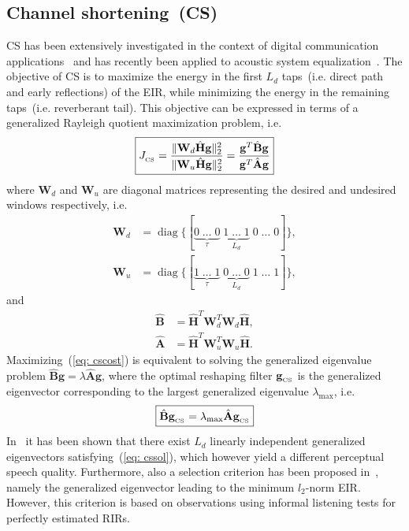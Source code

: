\documentclass{article}
\DeclareMathOperator{\diag}{diag}
\begin{document}
\subsection{Channel shortening~(CS)}
CS has been extensively investigated in the context of digital communication applications~\cite{Martin_ITSP_2005} and has recently been applied to acoustic system equalization~\cite{Zhang_IWAENC_2010,Kallinger_ICASSP_2006}.
The objective of CS is to maximize the energy in the first $L_d$ taps~(i.e. direct path and early reflections) of the EIR, while minimizing the energy in the remaining taps~(i.e. reverberant tail).
This objective can be expressed in terms of a generalized Rayleigh quotient maximization problem, i.e.
\begin{equation}
  \label{eq: cscost}
  \boxed{J_{_{\rm CS}} = \frac{\|\mathbf{W}_d \hat{\mathbf{H}}\mathbf{g} \|_2^2}{\|\mathbf{W}_u \hat{\mathbf{H}}\mathbf{g} \|_2^2} = \frac{\mathbf{g}^T\hat{\mathbf{B}}\mathbf{g}}{\mathbf{g}^T\hat{\mathbf{A}}\mathbf{g}}}
\end{equation}
where $\mathbf{W}_d$ and $\mathbf{W}_u$ are diagonal matrices representing the desired and undesired windows respectively, i.e.
\begin{align}
\label{eq: wincs}
\mathbf{W}_d & = {\diag} \{ [\underbrace{0 \; \ldots \; 0}_{\tau} \; \underbrace{1 \; \ldots \; 1}_{L_d}\; 0\; \ldots\; 0] \},  \\
\mathbf{W}_u & =  {\diag} \{ [\underbrace{1 \; \ldots \; 1}_{\tau} \; \underbrace{0 \; \ldots \; 0}_{L_d}\; 1\; \ldots\; 1] \},
\end{align}
and
\begin{align}
\hat{\mathbf{B}} & = \hat{\mathbf{H}}^{T} \mathbf{W}_d^T\mathbf{W}_d\hat{\mathbf{H}},  \\
\hat{\mathbf{A}} & = \hat{\mathbf{H}}^{T}\mathbf{W}_u^T\mathbf{W}_u \hat{\mathbf{H}}.
\end{align} 
Maximizing~(\ref{eq: cscost}) is equivalent to solving the generalized eigenvalue problem $\hat{\mathbf{B}}\mathbf{g} = \lambda \hat{\mathbf{A}}\mathbf{g}$, where the optimal reshaping filter $\mathbf{g}_{_{\rm CS}}$ is the generalized eigenvector corresponding to the largest generalized eigenvalue $\lambda_{\max}$, i.e.
\begin{equation}
  \label{eq: cssol}
  \boxed{\hat{\mathbf{B}}\mathbf{g}_{_{\rm CS}} = \lambda_{\max}\hat{\mathbf{A}}\mathbf{g}_{_{\rm CS}}}
\end{equation}
In~\cite{Zhang_IWAENC_2010} it has been shown that there exist $L_d$ linearly independent generalized eigenvectors satisfying~(\ref{eq: cssol}), which however yield a different perceptual speech quality.
Furthermore, also a selection criterion has been proposed in~\cite{Zhang_IWAENC_2010}, namely the generalized eigenvector leading to the minimum $l_2$-norm EIR.
However, this criterion is based on observations using informal listening tests for perfectly estimated RIRs.
\end{document}
